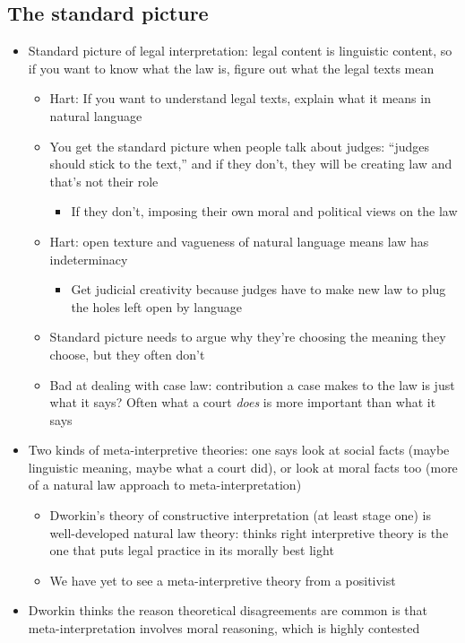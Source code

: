 \hypertarget{the-standard-picture}{%
\subsection{The standard picture}\label{the-standard-picture}}

\begin{itemize}
\tightlist
\item
  Standard picture of legal interpretation: legal content is linguistic
  content, so if you want to know what the law is, figure out what the
  legal texts mean

  \begin{itemize}
  \tightlist
  \item
    Hart: If you want to understand legal texts, explain what it means
    in natural language
  \item
    You get the standard picture when people talk about judges: ``judges
    should stick to the text,'' and if they don't, they will be creating
    law and that's not their role

    \begin{itemize}
    \tightlist
    \item
      If they don't, imposing their own moral and political views on the
      law
    \end{itemize}
  \item
    Hart: open texture and vagueness of natural language means law has
    indeterminacy

    \begin{itemize}
    \tightlist
    \item
      Get judicial creativity because judges have to make new law to
      plug the holes left open by language
    \end{itemize}
  \item
    Standard picture needs to argue why they're choosing the meaning
    they choose, but they often don't
  \item
    Bad at dealing with case law: contribution a case makes to the law
    is just what it says? Often what a court \emph{does} is more
    important than what it says
  \end{itemize}
\item
  Two kinds of meta-interpretive theories: one says look at social facts
  (maybe linguistic meaning, maybe what a court did), or look at moral
  facts too (more of a natural law approach to meta-interpretation)

  \begin{itemize}
  \tightlist
  \item
    Dworkin's theory of constructive interpretation (at least stage one)
    is well-developed natural law theory: thinks right interpretive
    theory is the one that puts legal practice in its morally best light
  \item
    We have yet to see a meta-interpretive theory from a positivist
  \end{itemize}
\item
  Dworkin thinks the reason theoretical disagreements are common is that
  meta-interpretation involves moral reasoning, which is highly
  contested
\end{itemize}

